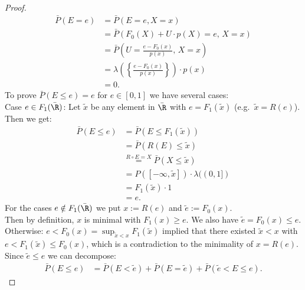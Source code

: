 \begin{Lem}
\begin{proof}
\begin{align*}
     \bar P(E=e) &= \bar P(E=e,X=x)\\
                  &= \bar P( F_0(X) + U \cdot p(X) = e,\,   X=x) \\
                  &= \bar P\left( U = \frac{e-F_0(x)}{p(x)},\, X=x \right)  \\
                  &= \lambda\left(\left\{ \frac{e-F_0(x)}{p(x)}\right\}\right)\cdot p(x) \\
                  &= 0.
 \end{align*}
%
 To prove $\bar P(E \le e) =e$ for $e \in [0,1]$ we have several cases:\\
%
Case $e \in F_1(\bar\R)$: 
 Let $\tilde x$ be any element in $\bar\R$ with $e=F_1(\tilde x)$ (e.g.\ $\tilde x= R(e)$). Then we get:
\begin{align*}
    \bar P(E \le e) &= \bar P( E \le F_1(\tilde x) ) \\
                 &= \bar P(  R(E) \le \tilde x ) \\
    &\stackrel{R \circ E = X}{=} \bar P( X \le \tilde x ) \\
    &= P([-\infty,\tilde x]) \cdot \lambda((0,1]) \\
    &= F_1(\tilde x) \cdot 1 \\
    &= e.
\end{align*}
%
For the cases $e \notin F_1(\bar\R)$ we put $x:=R(e)$ and $\tilde e:=F_0(x)$. \\
    Then by definition, $x$ is minimal with $F_1(x) \ge e$. 
    We also have $\tilde e = F_0(x) \le e$.
    Otherwise: %
    $e < F_0(x) = \sup_{\tilde x < x} F_1(\tilde x)$ 
    implied that there existed $\tilde x < x$  with $e<F_1(\tilde x) \le F_0(x)$, which is a contradiction to the minimality of $x=R(e)$. 
%
 Since $\tilde e \le e$ we can decompose:
    \begin{align*}
  \bar P(E \le e) &= \bar P(E < \tilde e) + \bar P(E=\tilde e) + \bar P(\tilde e< E \le e).
    \end{align*}

\end{proof}
\end{Lem}
